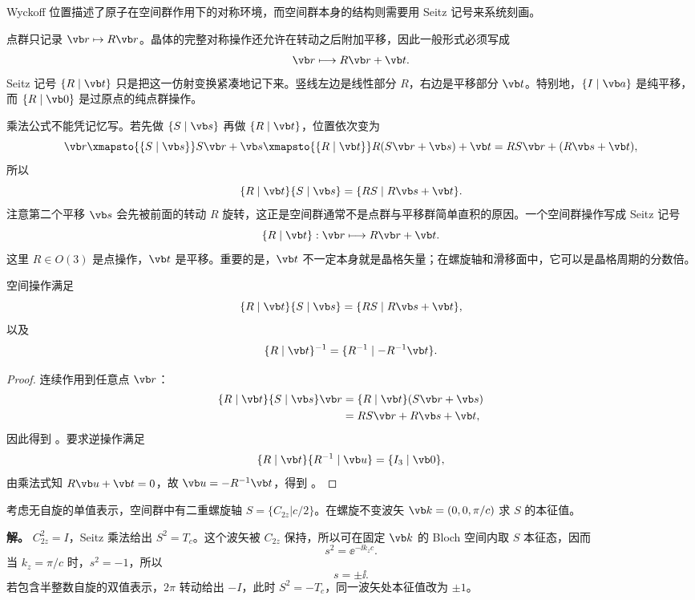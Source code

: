 Wyckoff 位置描述了原子在空间群作用下的对称环境，而空间群本身的结构则需要用 Seitz 记号来系统刻画。

点群只记录 $\vb r\mapsto R\vb r$。晶体的完整对称操作还允许在转动之后附加平移，因此一般形式必须写成
\[
\vb r\longmapsto R\vb r+\vb t.
\]
Seitz 记号 $\{R\mid\vb t\}$ 只是把这一仿射变换紧凑地记下来。竖线左边是线性部分 $R$，右边是平移部分 $\vb t$。特别地，$\{I\mid\vb a\}$ 是纯平移，而 $\{R\mid\vb 0\}$ 是过原点的纯点群操作。

乘法公式不能凭记忆写。若先做 $\{S\mid\vb s\}$ 再做 $\{R\mid\vb t\}$，位置依次变为
\[
\vb r\xmapsto{\{S\mid\vb s\}}S\vb r+\vb s
\xmapsto{\{R\mid\vb t\}}R(S\vb r+\vb s)+\vb t
=RS\vb r+(R\vb s+\vb t),
\]
所以
\[
\{R\mid\vb t\}\{S\mid\vb s\}=\{RS\mid R\vb s+\vb t\}.
\]
注意第二个平移 $\vb s$ 会先被前面的转动 $R$ 旋转，这正是空间群通常不是点群与平移群简单直积的原因。一个空间群操作写成 Seitz 记号
\[
\{R\mid\vb t\}:\vb r\longmapsto R\vb r+\vb t.
\]
这里 $R\in O(3)$ 是点操作，$\vb t$ 是平移。重要的是，$\vb t$ 不一定本身就是晶格矢量；在螺旋轴和滑移面中，它可以是晶格周期的分数倍。

\begin{proposition}
空间操作满足
\[
\{R\mid\vb t\}\{S\mid\vb s\}
=\{RS\mid R\vb s+\vb t\},
\label{eq:seitz-product}
\]
以及
\[
\{R\mid\vb t\}^{-1}
=\{R^{-1}\mid- R^{-1}\vb t\}.
\label{eq:seitz-inverse}
\]
\label{prop:seitz-algebra}

\end{proposition}

\begin{proof}
连续作用到任意点 $\vb r$：
\begin{align*}
\{R\mid\vb t\}\{S\mid\vb s\}\vb r
&=\{R\mid\vb t\}(S\vb r+\vb s)\\
&=RS\vb r+R\vb s+\vb t,
\end{align*}
因此得到 。要求逆操作满足
\[
\{R\mid\vb t\}\{R^{-1}\mid\vb u\}=
\{I_3\mid\vb0\},
\]
由乘法式知 $R\vb u+\vb t=0$，故 $\vb u=-R^{-1}\vb t$，得到 。
\end{proof}

\begin{workedexample}
考虑无自旋的单值表示，空间群中有二重螺旋轴 $S=\{C_{2z}|c/2\}$。在螺旋不变波矢 $\vb k=(0,0,\pi/c)$ 求 $S$ 的本征值。

\textbf{解。} $C_{2z}^2=I$，Seitz 乘法给出 $S^2=T_c$。这个波矢被 $C_{2z}$ 保持，所以可在固定 $\vb k$ 的 Bloch 空间内取 $S$ 本征态，因而
\[
s^2=\ee^{-\ii k_z c}.
\]
当 $k_z=\pi/c$ 时，$s^2=-1$，所以
\[
s=\pm\ii.
\]
若包含半整数自旋的双值表示，$2\pi$ 转动给出 $-I$，此时 $S^2=-T_c$，同一波矢处本征值改为 $\pm1$。
\end{workedexample}

